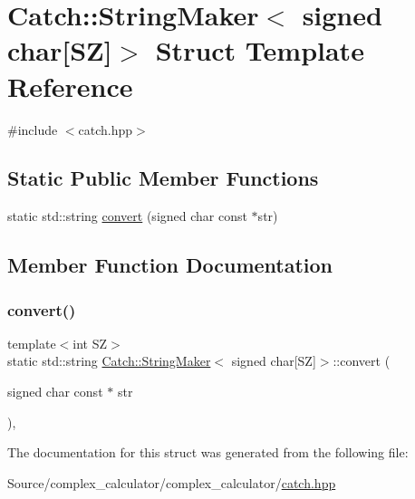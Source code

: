 \hypertarget{struct_catch_1_1_string_maker_3_01signed_01char[_s_z]_4}{}\section{Catch\+:\+:String\+Maker$<$ signed char\mbox{[}SZ\mbox{]}$>$ Struct Template Reference}
\label{struct_catch_1_1_string_maker_3_01signed_01char[_s_z]_4}


{\ttfamily \#include $<$catch.\+hpp$>$}

\subsection*{Static Public Member Functions}
\begin{DoxyCompactItemize}
\item 
static std\+::string \mbox{\hyperlink{struct_catch_1_1_string_maker_3_01signed_01char[_s_z]_4_a23ac689cc79dbcfe9b1765fe9e25690e}{convert}} (signed char const $\ast$str)
\end{DoxyCompactItemize}


\subsection{Member Function Documentation}
\mbox{\label{struct_catch_1_1_string_maker_3_01signed_01char[_s_z]_4_a23ac689cc79dbcfe9b1765fe9e25690e}} 
\subsubsection{\texorpdfstring{convert()}{convert()}}
{\footnotesize\ttfamily template$<$int SZ$>$ \\
static std\+::string \mbox{\hyperlink{struct_catch_1_1_string_maker}{Catch\+::\+String\+Maker}}$<$ signed char\mbox{[}SZ\mbox{]}$>$\+::convert (\begin{DoxyParamCaption}\item[{signed char const $\ast$}]{str }\end{DoxyParamCaption})\hspace{0.3cm}{\ttfamily [inline]}, {\ttfamily [static]}}



The documentation for this struct was generated from the following file\+:\begin{DoxyCompactItemize}
\item 
Source/complex\+\_\+calculator/complex\+\_\+calculator/\mbox{\hyperlink{catch_8hpp}{catch.\+hpp}}\end{DoxyCompactItemize}
